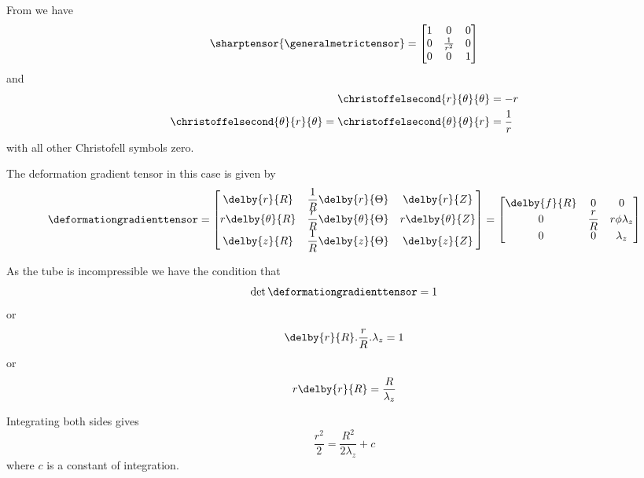 From  we have
\begin{equation}
  \sharptensor{\generalmetrictensor}=\begin{bmatrix}
  1 & 0 & 0 \\
  0 & \frac{1}{r^{2}} & 0 \\
  0 & 0 & 1
  \end{bmatrix}
\end{equation}
and
\begin{align}
  \christoffelsecond{r}{\theta}{\theta}&=-r \\
  \christoffelsecond{\theta}{r}{\theta}=\christoffelsecond{\theta}{\theta}{r}&=\frac{1}{r}
\end{align}
with all other Christofell symbols zero.

The deformation gradient tensor in this case is given by
\begin{equation}
  \deformationgradienttensor=\begin{bmatrix}
  \delby{r}{R} & \dfrac{1}{R}\delby{r}{\Theta} & \delby{r}{Z} \\
  r\delby{\theta}{R} & \dfrac{r}{R}\delby{\theta}{\Theta} & r \delby{\theta}{Z} \\
  \delby{z}{R} & \dfrac{1}{R}\delby{z}{\Theta} & \delby{z}{Z}
  \end{bmatrix}=\begin{bmatrix}
  \delby{f}{R} & 0 & 0 \\
  0 & \dfrac{r}{R} & r\phi\lambda_{z} \\
  0 & 0 & \lambda_{z}
  \end{bmatrix}
\end{equation}

As the tube is incompressible we have the condition that
\begin{equation}
  \det{\deformationgradienttensor}=1
\end{equation}
or
\begin{equation}
  \delby{r}{R}.\dfrac{r}{R}.\lambda_{z}=1
\end{equation}
or
\begin{equation}
  r\delby{r}{R}=\dfrac{R}{\lambda_{z}}
\end{equation}

Integrating both sides gives
\begin{equation}
  \dfrac{r^{2}}{2}=\dfrac{R^{2}}{2\lambda_{z}}+c
\end{equation}
where $c$ is a constant of integration.

